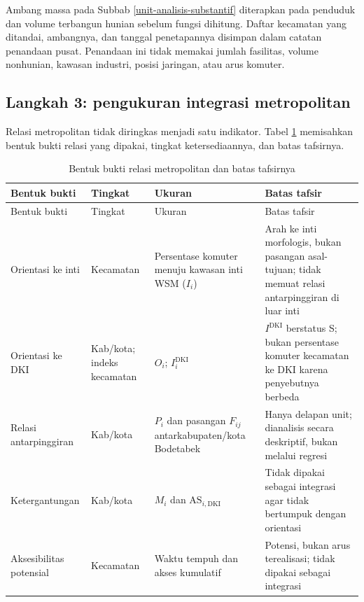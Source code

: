 \documentclass[12pt,a4paper,oneside,openany,indonesian]{report}
\begin{document}
Ambang massa pada Subbab \ref{unit-analisis-substantif} diterapkan pada
penduduk dan volume terbangun hunian sebelum fungsi dihitung. Daftar
kecamatan yang ditandai, ambangnya, dan tanggal penetapannya disimpan
dalam catatan penandaan pusat. Penandaan ini tidak memakai jumlah fasilitas, volume
nonhunian, kawasan industri, posisi jaringan, atau arus komuter.

\subsection{Langkah 3: pengukuran integrasi
metropolitan}\label{langkah-3-pengukuran-integrasi-metropolitan}

Relasi metropolitan tidak diringkas menjadi satu indikator. Tabel
\ref{tab:bab3-bentuk-relasi} memisahkan bentuk bukti relasi yang dipakai,
tingkat ketersediaannya, dan batas tafsirnya.

\begingroup
\footnotesize
\begin{longtable}{>{\raggedright\arraybackslash}p{} >{\raggedright\arraybackslash}p{} >{\raggedright\arraybackslash}p{} >{\raggedright\arraybackslash}p{}}
\caption{Bentuk bukti relasi metropolitan dan batas tafsirnya}\label{tab:bab3-bentuk-relasi}\\
\toprule
Bentuk bukti & Tingkat & Ukuran & Batas tafsir \\
\midrule
\endfirsthead
\toprule
Bentuk bukti & Tingkat & Ukuran & Batas tafsir \\
\midrule
\endhead
\bottomrule
\endlastfoot
Orientasi ke inti & Kecamatan & Persentase komuter menuju kawasan inti WSM ($I_i$) & Arah ke inti morfologis, bukan pasangan asal-tujuan; tidak memuat relasi antarpinggiran di luar inti \\
Orientasi ke DKI & Kab/kota; indeks kecamatan & $O_i$; $I^{\mathrm{DKI}}_i$ & $I^{\mathrm{DKI}}$ berstatus S; bukan persentase komuter kecamatan ke DKI karena penyebutnya berbeda \\
Relasi antarpinggiran & Kab/kota & $P_i$ dan pasangan $F_{ij}$ antarkabupaten/kota Bodetabek & Hanya delapan unit; dianalisis secara deskriptif, bukan melalui regresi \\
Ketergantungan & Kab/kota & $M_i$ dan $\mathrm{AS}_{i,\mathrm{DKI}}$ & Tidak dipakai sebagai integrasi agar tidak bertumpuk dengan orientasi \\
Aksesibilitas potensial & Kecamatan & Waktu tempuh dan akses kumulatif & Potensi, bukan arus terealisasi; tidak dipakai sebagai integrasi \\
\end{longtable}
\endgroup
\end{document}
